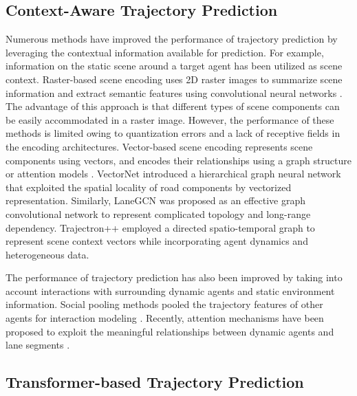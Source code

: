 \documentclass[10pt,twocolumn,letterpaper]{article}
\begin{document}
\subsection{Context-Aware Trajectory Prediction}
Numerous methods have improved the performance of trajectory prediction by leveraging the contextual information available for prediction. For example, information on the static scene around a target agent has been utilized as scene context.
Raster-based scene encoding uses 2D raster images to summarize scene information and extract semantic features using convolutional neural networks \cite{MHA-JAM, multipath, CoverNet, home, trajectron++, P2T, AIR2}.
 The advantage of this approach is that different types of scene components can be easily accommodated in a raster image. However, the performance of these methods is limited owing to quantization errors and a lack of receptive fields in the encoding architectures.
Vector-based scene encoding represents scene components using vectors, and encodes their relationships using a graph structure or attention models  \cite{LaneGCN, PGP, trajectron++, social-GAN, trajectron, interaction-hybrid-traffic-graph, VectorNet}.  VectorNet \cite{VectorNet} introduced a hierarchical graph neural network that exploited the spatial locality of road components by vectorized representation. Similarly, LaneGCN \cite{LaneGCN} was proposed as an effective graph convolutional network to represent complicated topology and long-range dependency. Trajectron++ \cite{trajectron++} employed a directed spatio-temporal graph to represent scene context vectors while incorporating agent dynamics and heterogeneous data.

The performance of trajectory prediction has also been improved by taking into account interactions with surrounding  dynamic agents and static environment information. Social pooling methods  pooled the trajectory features of other agents for interaction modeling \cite{social-lstm, desire, social-GAN, sophie, convolutional-social-pooling}. 
Recently, attention mechanisms  have been proposed to exploit the meaningful relationships between dynamic agents and lane segments \cite{LaPred, PRIME, HiVT, PGP, DenseTNT, LaneRCNN, LaneGCN, VectorNet, THOMAS, MHA-JAM, LTP, LaneGCN}. 



\subsection{Transformer-based Trajectory Prediction}
\end{document}

